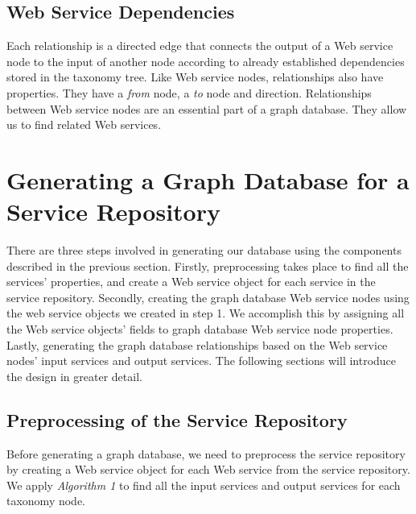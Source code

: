 \subsection {Web Service Dependencies}
Each relationship is a directed edge that connects the output of a Web service node to the input of another node according to already established dependencies stored in the taxonomy tree. Like Web service nodes, relationships also have properties. They have a \emph{from} node, a  \emph{to} node and direction. Relationships between Web service nodes are an essential part of a graph database. They allow us to find related Web services.  


\section {Generating a Graph Database for a Service Repository}

There are three steps involved in generating our database using the components described in the previous section. Firstly, preprocessing takes place to find all the services' properties, and create a Web service object for each service in the service repository. Secondly, creating the graph database Web service nodes using the web service objects we created in step 1. We accomplish this by assigning all the Web service objects' fields to graph database Web service node properties. Lastly, generating the graph database relationships based on the Web service nodes' input services and output services. The following sections will introduce the design in greater detail.   


\subsection{Preprocessing of the Service Repository}
Before generating a graph database, we need to preprocess the service repository by creating a Web service object for each Web service from the service repository. We apply \emph{Algorithm 1} to find all the input services and output services for each taxonomy node. 





